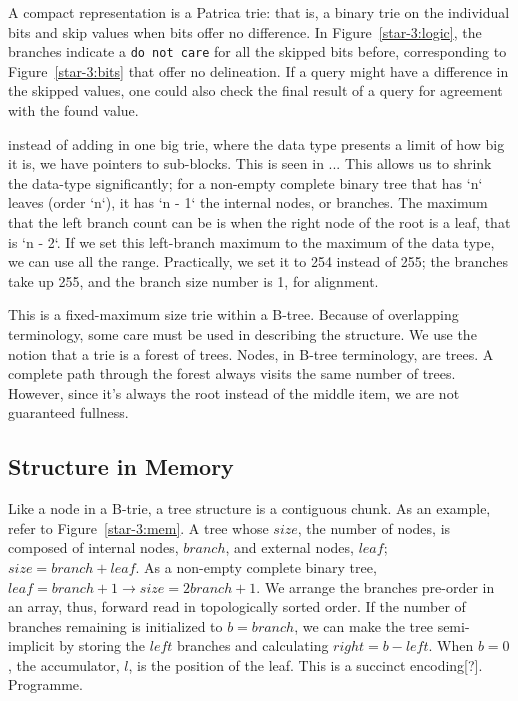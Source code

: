 \documentclass[12pt]{article}
\newcommand{\code}[1]{\colorbox{light-gray}{\texttt{#1}}}
\begin{document}
A compact representation is a Patrica trie\cite{morrison1968patricia}: that is, a binary trie on the individual bits and skip values when bits offer no difference. In Figure~\ref{star-3:logic}, the branches indicate a \code{do not care} for all the skipped bits before, corresponding to Figure~\ref{star-3:bits} that offer no delineation. If a query might have a difference in the skipped values, one could also check the final result of a query for agreement with the found value.

instead of adding in one big trie, where the data type presents a limit of how big it is, we have pointers to sub-blocks. This is seen in ... This allows us to shrink the data-type significantly; for a non-empty complete binary tree that has `n` leaves (order `n`), it has `n - 1` the internal nodes, or branches. The maximum that the left branch count can be is when the right node of the root is a leaf, that is `n - 2`. If we set this left-branch maximum to the maximum of the data type, we can use all the range. Practically, we set it to 254 instead of 255; the branches take up 255, and the branch size number is 1, for alignment.

This is a fixed-maximum size trie within a B-tree. Because of overlapping terminology, some care must be used in describing the structure. We use the notion that a trie is a forest of trees. Nodes, in B-tree terminology, are trees. A complete path through the forest always visits the same number of trees. However, since it's always the root instead of the middle item, we are not guaranteed fullness.

\subsection{Structure in Memory}

Like a node in a B-trie, a tree structure is a contiguous chunk. As an example, refer to Figure~\ref{star-3:mem}. A tree whose $\mathit{size}$, the number of nodes, is composed of internal nodes, $\mathit{branch}$, and external nodes, $\mathit{leaf}$; $\mathit{size} = \mathit{branch} + \mathit{leaf}$. As a non-empty complete binary tree, $\mathit{leaf} = \mathit{branch} + 1 \rightarrow \mathit{size} = 2\mathit{branch} + 1$. We arrange the branches pre-order in an array, thus, forward read in topologically sorted order. If the number of branches remaining is initialized to $b = \mathit{branch}$, we can make the tree semi-implicit by storing the $\mathit{left}$ branches and calculating $\mathit{right} = b - \mathit{left}$. When $b = 0$, the accumulator, $l$, is the position of the leaf. This is a succinct encoding[?]. Programme.
\end{document}
